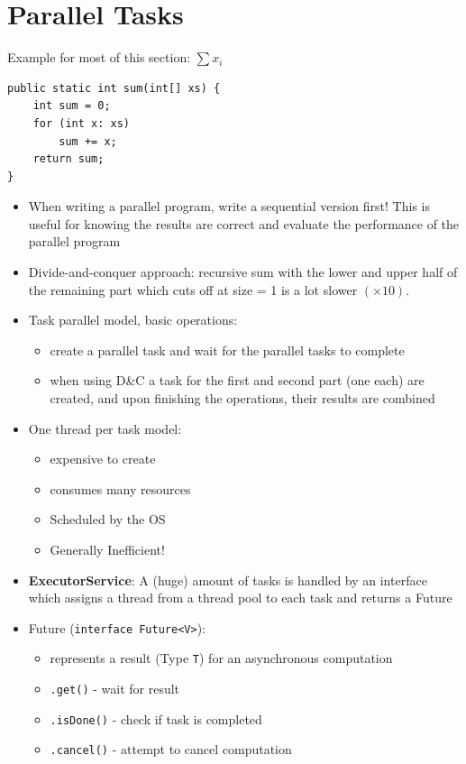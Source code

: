 \documentclass[a4paper]{article}
\newcommand{\inline}[1]{\lstinline!#1!}%
\begin{document}
\section{Parallel Tasks}
Example for most of this section: $\sum x_i$
\begin{lstlisting}
public static int sum(int[] xs) {
	int sum = 0;
	for (int x: xs)
		sum += x;
 	return sum;
}
\end{lstlisting}
\begin{itemize}
\item When writing a parallel program, write a sequential version first! This is useful for knowing the results are correct and evaluate the performance of the parallel program
\item Divide-and-conquer approach: recursive sum with the lower and upper half of the remaining part which cuts off at size = 1 is a lot slower $(\times 10)$. 
\item Task parallel model, basic operations: 
\begin{itemize}
\item create a parallel task and wait for the parallel tasks to complete
\item  when using D\&C a task for the first and second part (one each) are created, and upon finishing the operations, their results are combined
\end{itemize}
\item One thread per task model: 
\begin{itemize}
\item expensive to create
\item consumes many resources 
\item Scheduled by the OS
\item Generally Inefficient!
\end{itemize}
\item \textbf{ExecutorService}: A (huge) amount of tasks is handled by an interface which assigns a thread from a thread pool to each task and returns a Future
\item Future (\inline{interface Future<V>}):
\begin{itemize}
\item represents a result (Type \inline{T}) for an asynchronous computation
\item \inline{.get()} - wait for result
\item \inline{.isDone()} - check if task is completed
\item \inline{.cancel()} - attempt to cancel computation
\end{itemize}

\end{itemize}
\end{document}
